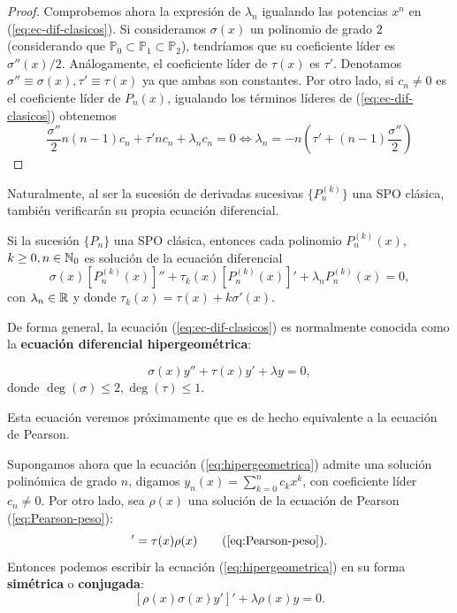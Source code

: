 \begin{proof}
    Comprobemos ahora la expresión de $\lambda_n$ igualando las potencias $x^n$ en (\ref{eq:ec-dif-clasicos}). Si consideramos $\sigma(x)$ un polinomio de grado $2$ (considerando que $\mathbb P_0\subset\mathbb P_1\subset \mathbb{P}_2$), tendríamos que su coeficiente líder es $\sigma''(x)/2$. Análogamente, el coeficiente líder de $\tau(x)$ es $\tau'$. Denotamos $\sigma'' \equiv \sigma(x), \tau'\equiv\tau(x)$ ya que ambas son constantes. Por otro lado, si $c_n\neq 0$ es el coeficiente líder de $P_n(x)$, igualando los términos líderes de (\ref{eq:ec-dif-clasicos}) obtenemos
    $$
    \dfrac {\sigma''} 2 n (n-1) c_n + \tau' n c_n + \lambda_n c_n = 0 \Leftrightarrow \lambda_n = -n\left(\tau' + (n-1)\dfrac{\sigma''}{2}\right)
    $$
\end{proof}

Naturalmente, al ser la sucesión de derivadas sucesivas $\{P^{(k)}_n\}$ una SPO clásica, también verificarán su propia ecuación diferencial.

\begin{corolario}
    Si la sucesión $\{P_n\}$ una SPO clásica, entonces cada polinomio $P^{(k)}_n(x)$, $k\geq 0, n\in\mathbb{N}_0$ es solución de la ecuación diferencial
    \begin{equation}
        \label{eq:ec-dif-der-suc}
        \sigma(x)[P_n^{(k)}(x)]'' + \tau_k(x)[P_n^{(k)}(x)]'+\lambda_n P^{(k)}_n(x) = 0,
    \end{equation}
    con $\lambda_n\in\mathbb{R}$ y donde $\tau_k(x)=\tau(x)+k\sigma'(x)$.
\end{corolario}

De forma general, la ecuación (\ref{eq:ec-dif-clasicos}) es normalmente conocida como la \textbf{ecuación diferencial hipergeométrica}:

\begin{equation}
    \label{eq:hipergeometrica}
    \sigma(x)y'' + \tau(x) y' + \lambda y = 0,
\end{equation}
donde $ \deg(\sigma)\leq 2, \deg(\tau)\leq 1$.

Esta ecuación veremos próximamente que es de hecho equivalente a la ecuación de Pearson. 

Supongamos ahora que la ecuación (\ref{eq:hipergeometrica}) admite una solución polinómica de grado $n$, digamos $y_n(x) = \sum_{k=0}^n c_k x^k$, con coeficiente líder $c_n\neq 0$. Por otro lado, sea $\rho(x)$ una solución de la ecuación de Pearson (\ref{eq:Pearson-peso}):
\begin{equation*}
    [\sigma(x)\rho(x)]'=\tau(x)\rho(x) \tag{\ref{eq:Pearson-peso}}.
\end{equation*}
Entonces podemos escribir la ecuación (\ref{eq:hipergeometrica}) en su forma \textbf{simétrica} o \textbf{conjugada}:
\begin{equation}
    \label{eq:hipergeometrica-conjugada}
    [\rho(x)\sigma(x)y']' + \lambda \rho(x) y = 0.
\end{equation}

